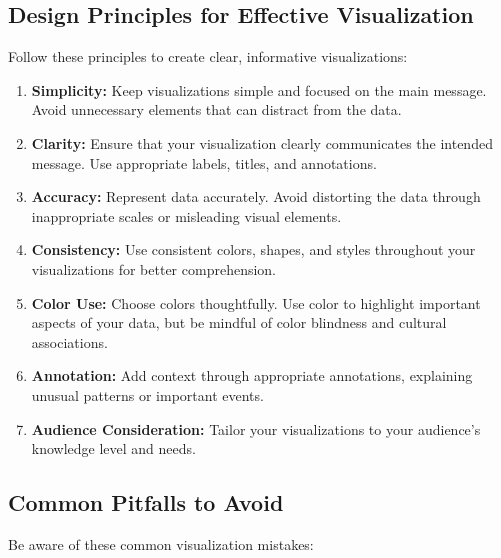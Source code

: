 \documentclass[
  letterpaper,
]{book}
\begin{document}
\subsection{Design Principles for Effective
Visualization}\label{design-principles-for-effective-visualization}

Follow these principles to create clear, informative visualizations:

\begin{enumerate}
\def\labelenumi{\arabic{enumi}.}
\item
  \textbf{Simplicity:} Keep visualizations simple and focused on the
  main message. Avoid unnecessary elements that can distract from the
  data.
\item
  \textbf{Clarity:} Ensure that your visualization clearly communicates
  the intended message. Use appropriate labels, titles, and annotations.
\item
  \textbf{Accuracy:} Represent data accurately. Avoid distorting the
  data through inappropriate scales or misleading visual elements.
\item
  \textbf{Consistency:} Use consistent colors, shapes, and styles
  throughout your visualizations for better comprehension.
\item
  \textbf{Color Use:} Choose colors thoughtfully. Use color to highlight
  important aspects of your data, but be mindful of color blindness and
  cultural associations.
\item
  \textbf{Annotation:} Add context through appropriate annotations,
  explaining unusual patterns or important events.
\item
  \textbf{Audience Consideration:} Tailor your visualizations to your
  audience's knowledge level and needs.
\end{enumerate}

\subsection{Common Pitfalls to Avoid}\label{common-pitfalls-to-avoid}

Be aware of these common visualization mistakes:
\end{document}
